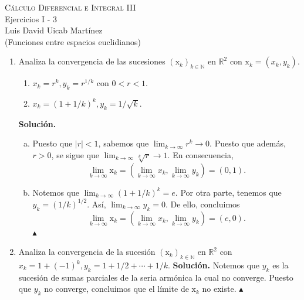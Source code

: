 \documentclass[12pt]{article}
\newcommand{\abs}[1]{\left\vert#1\right\vert}
\newcommand{\N}{\mathbb N}
\newcommand{\R}{\mathbb R}
\newcommand{\x}{\mathrm x}
\newcommand{\xk}{(\x_k)_{k\in \N}}
\begin{document}
\pagestyle{empty}
\begin{center}
{\textsc{Cálculo Diferencial e Integral III} \\
\medskip 
\large{Ejercicios I - 3 \\
Luis David Uicab Martínez \\
(Funciones entre espacios euclidianos)}}
\end{center}
\bigskip

\begin{enumerate}
    \item Analiza la convergencia de las sucesiones $\xk$ en $\R^2$ con $\x_k=(x_k,y_k)$.
        \begin{enumerate}[(1)]
            \item $x_k=r^k, y_k=r^{1/k}$ con $0<r<1$.
            \item $x_k=(1+1/k)^k, y_k=1/\sqrt{k}$.
        \end{enumerate}
    \textbf{Solución.}
    \begin{enumerate}[(a)]
        \item Puesto que $\abs{r}<1$, sabemos que $\lim_{k\to \infty}r^k\rightarrow 0$. Puesto que además, $r>0$, se sigue que $\lim_{k\to \infty}\sqrt[k]{r}\rightarrow 1$.
            En consecuencia,
            \[
                \lim_{k\to \infty}\x_k = \left(\lim_{k\to \infty} x_k,\lim_{k\to \infty} y_k\right) = (0,1).
            \]
            \item Notemos que $\lim_{k\to \infty}(1+1/k)^k=e$. Por otra parte, tenemos que $y_k=(1/k)^{1/2}$. Así, $\lim_{k\to \infty}y_k=0$. De ello, concluimos
            \[
                \lim_{k\to \infty}\x_k = \left(\lim_{k\to \infty} x_k,\lim_{k\to \infty} y_k\right) = (e,0).
            \]
            \hfill $\blacktriangle$
    \end{enumerate}


    \item Analiza la convergencia de la sucesión $\xk$ en $\R^2$ con 
        $x_k=1+(-1)^k, y_k=1 + 1/2 + \cdots + 1/k$.
        \textbf{Solución.} Notemos que $y_k$ es la sucesión de sumas parciales de la seria armónica la cual no converge. Puesto que $y_k$ no converge, concluimos que el límite de $\x_k$ no existe. $\blacktriangle$


\end{enumerate}
\end{document}
